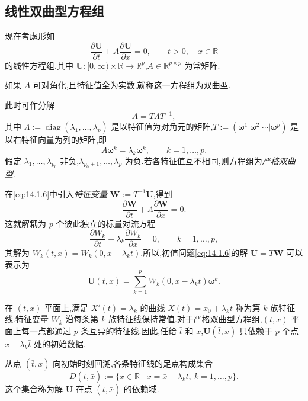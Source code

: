 \subsection{线性双曲型方程组}\label{sec:14.1.2}

现在考虑形如
\begin{equation}\label{eq:14.1.6}
  \frac{\partial\boldsymbol{U}}{\partial t}+A\frac{\partial\boldsymbol{U}}{\partial x}=0,
     \qquad t>0,\quad x\in\mathbb R
\end{equation}
的线性方程组,其中 \(\boldsymbol{U}\colon[0,\infty)\times\mathbb R\to\mathbb R^p\),\(A\in\mathbb R^{p\times p}\) 为常矩阵.
\begin{definition*}
如果 \(A\) 可对角化,且特征值全为实数,就称这一方程组为{\heiti 双曲型}.
\end{definition*}
此时可作分解
\begin{equation}\label{eq:14.1.7}
  A=T\Lambda T^{-1},
\end{equation}
其中 \(\Lambda:=\operatorname{diag}(\lambda_1,\ldots,\lambda_p)\) 是以特征值为对角元的矩阵,\(T:=(\boldsymbol{\omega}^1|\boldsymbol{\omega}^2|\cdots|\boldsymbol{\omega}^p)\) 是以右特征向量为列的矩阵,即
\[
  A\boldsymbol{\omega}^k=\lambda_k\boldsymbol{\omega}^k,\qquad k=1,\ldots,p.
\]
假定 \(\lambda_1,\ldots,\lambda_{p_0}\) 非负,\(\lambda_{p_0+1},\ldots,\lambda_p\) 为负.若各特征值互不相同,则方程组为\emph{严格双曲型}.

在\eqref{eq:14.1.6}中引入\emph{特征变量} \(\boldsymbol{W}:=T^{-1}\boldsymbol{U}\),得到
\begin{equation}\label{eq:14.1.8}
  \frac{\partial\boldsymbol{W}}{\partial t}
    +\Lambda\frac{\partial\boldsymbol{W}}{\partial x}=0.
\end{equation}
这就解耦为 \(p\) 个彼此独立的标量对流方程
\begin{equation}\label{eq:14.1.9}
  \frac{\partial W_k}{\partial t}+\lambda_k\frac{\partial W_k}{\partial x}=0,
    \qquad k=1,\ldots,p,
\end{equation}
其解为 \(W_k(t,x)=W_k(0,x-\lambda_kt)\).所以,初值问题\eqref{eq:14.1.6}的解 \(\boldsymbol{U}=T\boldsymbol{W}\) 可以表示为
\begin{equation}\label{eq:14.1.10}
  \boldsymbol{U}(t,x)=\sum_{k=1}^pW_k(0,x-\lambda_kt)\boldsymbol{\omega}^k.
\end{equation}

在 \((t,x)\) 平面上,满足 \(X'(t)=\lambda_k\) 的曲线 \(X(t)=x_0+\lambda_kt\) 称为第 \(k\) 族特征线.特征变量 \(W_k\) 沿每条第 \(k\) 族特征线保持常值.对于严格双曲型方程组,\((t,x)\) 平面上每一点都通过 \(p\) 条互异的特征线.因此,任给 \(\bar t\) 和 \(\bar x\),\(\boldsymbol{U}(\bar t,\bar x)\) 只依赖于 \(p\) 个点 \(\bar x-\lambda_k\bar t\) 处的初始数据.
\begin{definition*}
从点 \((\bar t,\bar x)\) 向初始时刻回溯,各条特征线的足点构成集合
\begin{equation}\label{eq:14.1.11}
  D(\bar t,\bar x):=\{x\in\mathbb R\mid x=\bar x-\lambda_k\bar t,\ k=1,\ldots,p\}.
\end{equation}
这个集合称为解 \(\boldsymbol{U}\) 在点 \((\bar t,\bar x)\) 的{\heiti 依赖域}.
\end{definition*}

